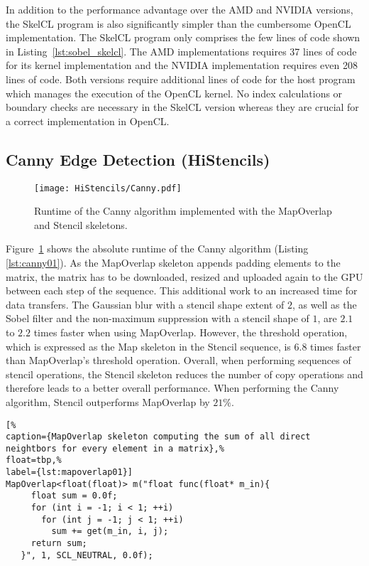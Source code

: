 In addition to the performance advantage over the AMD and NVIDIA versions, the SkelCL program is also significantly simpler than the cumbersome OpenCL implementation.
The SkelCL program only comprises the few lines of code shown in Listing~\ref{lst:sobel_skelcl}.
The AMD implementations requires 37 lines of code for its kernel implementation and the NVIDIA implementation requires even 208 lines of code.
Both versions require additional lines of code for the host program which manages the execution of the OpenCL kernel.
No index calculations or boundary checks are necessary in the SkelCL version whereas they are crucial for a correct implementation in OpenCL.


\subsection{Canny Edge Detection (HiStencils)}
\begin{figure}[tbp]
	\centering
	\texttt{[image: HiStencils/Canny.pdf]}
	\caption{Runtime of the Canny algorithm implemented with the MapOverlap and Stencil skeletons.}
	\label{fig:canny}
\end{figure} 

Figure~\ref{fig:canny} shows the absolute runtime of the Canny algorithm (Listing \ref{lst:canny01}). 
As the MapOverlap skeleton appends padding elements to the matrix, the matrix has to be downloaded, resized and uploaded again to the GPU between each step of the sequence.
This additional work to an increased time for data transfers. 
The Gaussian blur with a stencil shape extent of $2$, as well as the Sobel filter and the non-maximum suppression with a stencil shape of $1$, are $2.1$ to $2.2$ times faster when using MapOverlap. 
However, the threshold operation, which is expressed as the Map skeleton in the Stencil sequence, is $6.8$ times faster than MapOverlap's threshold operation.
Overall, when performing sequences of stencil operations, the Stencil skeleton reduces the number of copy operations and therefore leads to a better overall performance.
When performing the Canny algorithm, Stencil outperforms MapOverlap by $21\%$.


\begin{lstlisting}[%
caption={MapOverlap skeleton computing the sum of all direct neightbors for every element in a matrix},%
float=tbp,%
label={lst:mapoverlap01}]
MapOverlap<float(float)> m("float func(float* m_in){
     float sum = 0.0f;
     for (int i = -1; i < 1; ++i)
       for (int j = -1; j < 1; ++i)
         sum += get(m_in, i, j);
     return sum;
   }", 1, SCL_NEUTRAL, 0.0f);
\end{lstlisting}

